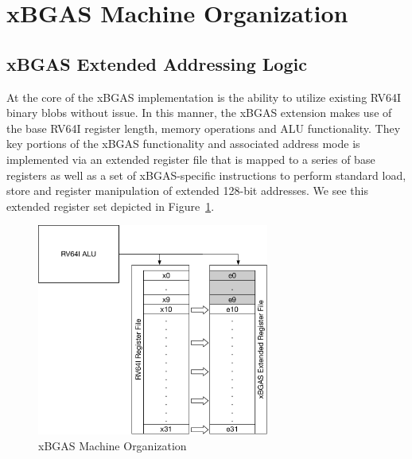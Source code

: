 \documentclass{article}
\begin{document}
\clearpage
\section{xBGAS Machine Organization}

\subsection{xBGAS Extended Addressing Logic}

At the core of the xBGAS implementation is the ability to utilize existing RV64I 
binary blobs without issue.  In this manner, the xBGAS extension makes use 
of the base RV64I register length, memory operations and ALU functionality.  
They key portions of the xBGAS functionality and associated address mode 
is implemented via an extended register file that is mapped to a series 
of base registers as well as a set of xBGAS-specific instructions to perform 
standard load, store and register manipulation of extended 128-bit addresses.  We 
see this extended register set depicted in Figure~\ref{fig:machineorganization}.  

\begin{figure}[h!]
\begin{center}
\includegraphics[width=3in]{figures/rv128imachorg.pdf}
\caption{xBGAS Machine Organization}
\label{fig:machineorganization}
\end{center}
\end{figure}
\end{document}
